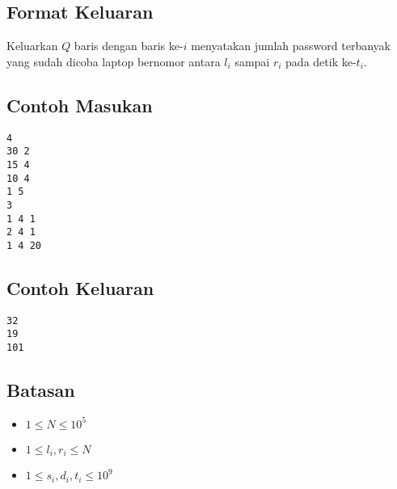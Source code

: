 \documentclass{article}
\begin{document}
\subsection*{Format Keluaran}

\par\noindent Keluarkan $Q$ baris dengan baris ke-$i$ menyatakan jumlah password terbanyak yang sudah dicoba laptop bernomor antara $l_i$ sampai $r_i$ pada detik ke-$t_i$.

\subsection*{Contoh Masukan}

\begin{lstlisting}
4
30 2
15 4
10 4
1 5
3
1 4 1
2 4 1
1 4 20
\end{lstlisting}

\subsection*{Contoh Keluaran}

\begin{lstlisting}
32
19
101
\end{lstlisting}

\subsection*{Batasan}

\begin{itemize}
  \item $1 \leq N \leq 10^5$
  \item $1 \leq l_i, r_i \leq N$
  \item $1 \leq s_i, d_i, t_i \leq 10^9$
\end{itemize}
\end{document}
